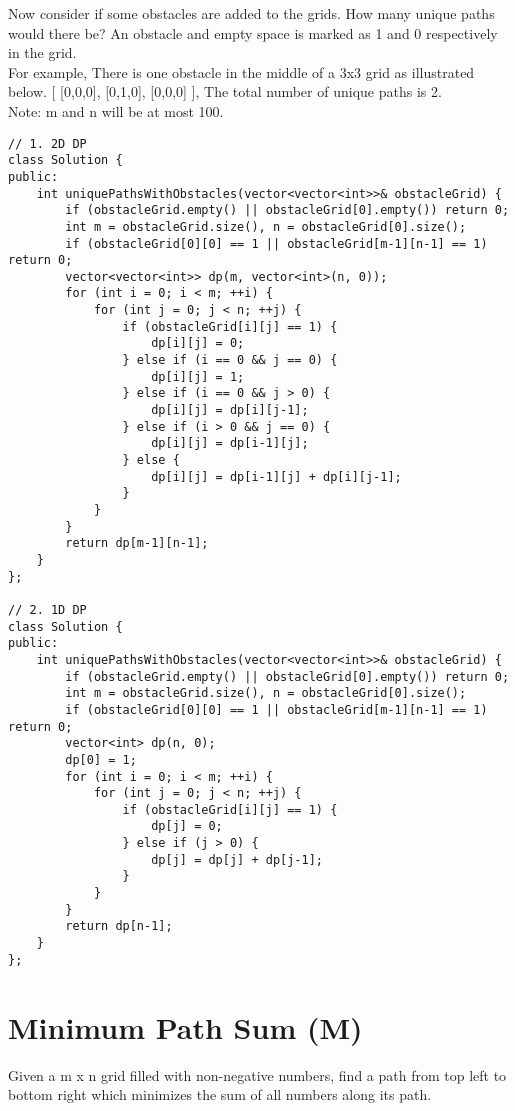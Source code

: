 Now consider if some obstacles are added to the grids. How many unique paths would there be? An obstacle and empty space is marked as 1 and 0 respectively in the grid.\\

For example, There is one obstacle in the middle of a 3x3 grid as illustrated below.
[
  [0,0,0],
  [0,1,0],
  [0,0,0]
], The total number of unique paths is 2.\\

Note: m and n will be at most 100.\\

\begin{lstlisting}
// 1. 2D DP
class Solution {
public:
    int uniquePathsWithObstacles(vector<vector<int>>& obstacleGrid) {
        if (obstacleGrid.empty() || obstacleGrid[0].empty()) return 0;
        int m = obstacleGrid.size(), n = obstacleGrid[0].size();
        if (obstacleGrid[0][0] == 1 || obstacleGrid[m-1][n-1] == 1) return 0;
        vector<vector<int>> dp(m, vector<int>(n, 0));
        for (int i = 0; i < m; ++i) {
            for (int j = 0; j < n; ++j) {
                if (obstacleGrid[i][j] == 1) {
                    dp[i][j] = 0;
                } else if (i == 0 && j == 0) {
                    dp[i][j] = 1;
                } else if (i == 0 && j > 0) {
                    dp[i][j] = dp[i][j-1];
                } else if (i > 0 && j == 0) {
                    dp[i][j] = dp[i-1][j];
                } else {
                    dp[i][j] = dp[i-1][j] + dp[i][j-1];
                }
            }
        }
        return dp[m-1][n-1];
    }
};

// 2. 1D DP
class Solution {
public:
    int uniquePathsWithObstacles(vector<vector<int>>& obstacleGrid) {
        if (obstacleGrid.empty() || obstacleGrid[0].empty()) return 0;
        int m = obstacleGrid.size(), n = obstacleGrid[0].size();
        if (obstacleGrid[0][0] == 1 || obstacleGrid[m-1][n-1] == 1) return 0;
        vector<int> dp(n, 0);
        dp[0] = 1;
        for (int i = 0; i < m; ++i) {
            for (int j = 0; j < n; ++j) {
                if (obstacleGrid[i][j] == 1) {
                    dp[j] = 0;
                } else if (j > 0) {
                    dp[j] = dp[j] + dp[j-1];
                }
            }
        }
        return dp[n-1];
    }
};
\end{lstlisting}


\section{Minimum Path Sum (M)}
Given a m x n grid filled with non-negative numbers, find a path from top left to bottom right which minimizes the sum of all numbers along its path.\\

